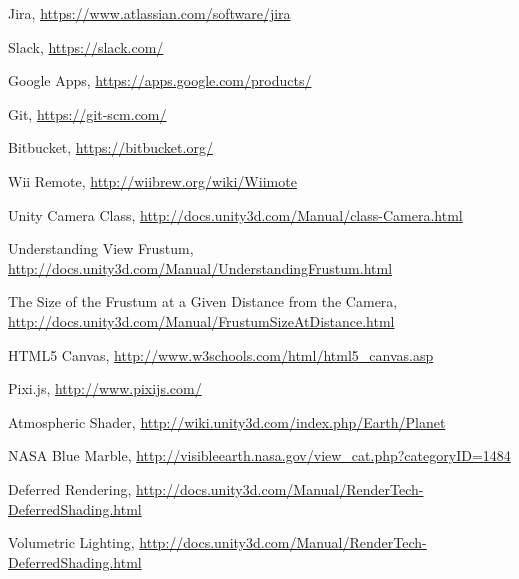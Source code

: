 \documentclass[a4paper,11pt]{article}
\begin{document}
\begin{thebibliography}{9}

	Jira,
    \url{https://www.atlassian.com/software/jira}
    
	Slack,
    \url{https://slack.com/}
    
	Google Apps,
    \url{https://apps.google.com/products/}
    
	Git,
    \url{https://git-scm.com/}
    
	Bitbucket,
    \url{https://bitbucket.org/}

  Wii Remote,
  \url{http://wiibrew.org/wiki/Wiimote}

  Unity Camera Class,
  \url{http://docs.unity3d.com/Manual/class-Camera.html}
  
  Understanding View Frustum,
  \url{http://docs.unity3d.com/Manual/UnderstandingFrustum.html}

  The Size of the Frustum at a Given Distance from the Camera,
  \url{http://docs.unity3d.com/Manual/FrustumSizeAtDistance.html}

  HTML5 Canvas,
  \url{http://www.w3schools.com/html/html5_canvas.asp}

  Pixi.js,
  \url{http://www.pixijs.com/}
  
  Atmospheric Shader,
 \url{http://wiki.unity3d.com/index.php/Earth/Planet}
  
  NASA Blue Marble,
 \url{http://visibleearth.nasa.gov/view_cat.php?categoryID=1484}
 
  Deferred Rendering,
 \url{http://docs.unity3d.com/Manual/RenderTech-DeferredShading.html}
 
  Volumetric Lighting,
 \url{http://docs.unity3d.com/Manual/RenderTech-DeferredShading.html}

\end{thebibliography}
\end{document}
